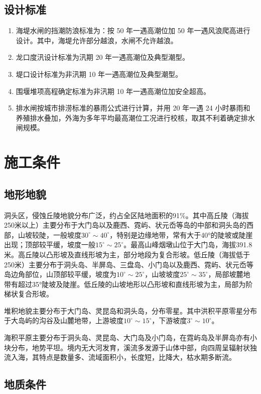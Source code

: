 \documentclass[UTF8, a4paper, 12pt]{ctexart} %
\begin{document}
\subsection{设计标准}
\begin{enumerate}
    \item 海堤水闸的挡潮防浪标准为：按 50 年一遇高潮位加 50 年一遇风浪爬高进行设计。其中，海堤允许部分越浪，水闸不允许越浪。
    \item 龙口度汛设计标准为汛期 20 年一遇高潮位及典型潮型。
    \item 堤口设计标准为非汛期 10 年一遇高潮位及典型潮型。
    \item 围堰堆项高程确定标准为非汛期 10 年一遇高潮位加安全超高。
    \item 排水闸按城市排涝标准的暴雨公式进行计算，并用 20 年一遇 24 小时暴雨和养殖排水叠加，外海为多年平均最高潮位工况进行校核，取其不利着确定排水闸规模。
\end{enumerate}

\section{施工条件}
\subsection{地形地貌}
洞头区，侵蚀丘陵地貌分布广泛，约占全区陆地面积的91\%。其中高丘陵（海拔250米以上）主要分布于大门岛以及鹿西、霓屿、状元岙等岛的中部和洞头岛的西部，山坡较陡，一般坡度$30^{\circ}\sim40^{\circ}$，特别是边缘地带，常有大于40°的陡坡或陡崖出现；顶部较平缓，坡度一般$15^{\circ}\sim25^{\circ}$。最高山峰烟墩山位于大门岛，海拔391.8米。高丘陵以凸形坡及直线形坡为主，部分地段为复合形坡。低丘陵（海拔低于250米）主要分布于洞头岛、半屏岛、三盘岛、小门岛以及鹿西、霓屿、状元岙等岛边角部位，山顶部较平缓，坡度为$10^{\circ}\sim25^{\circ}$，山坡坡度$25^{\circ}\sim35^{\circ}$，局部坡麓地带有超过35°陡坡及陡崖。低丘陵的山坡地形以凸形坡和直线形坡为主，局部为阶梯状复合形坡。
\par 堆积地貌主要分布于大门岛、灵昆岛和洞头岛，分布零星。其中洪积平原零星分布于大岛屿的沟谷及山麓地带，上游坡度$10^{\circ}\sim15^{\circ}$，下游坡度$3^{\circ}\sim10^{\circ}$。
\par 海积平原主要分布于洞头岛、灵昆岛、大门岛及小门岛，在霓屿岛及半屏岛亦有小块分布，地势平坦。境内无大河发育，溪流多发源于山体中部，向四周呈辐射状独流入海，其特点是数量多、流域面积小，长度短，比降大，枯水期多断流。

\subsection{地质条件}
\end{document}
